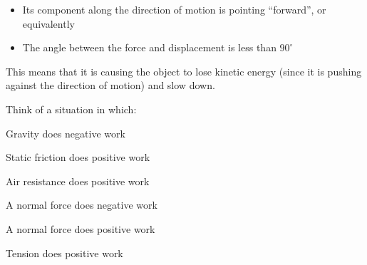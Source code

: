 \documentclass[12pt]{article}
\begin{document}
\begin{itemize}
	\item Its component along the direction of motion is pointing ``forward'', or equivalently
	\item The angle between the force and displacement is less than $90^\circ$
\end{itemize}

This means that it is causing the object to lose kinetic energy (since it is pushing against the direction of motion) and slow down.


\newpage

Think of a situation in which:

\vspace{0.3in}


\begin{minipage}{0.5\textwidth}	
	\begin{center}
		Gravity does negative work
	\end{center}
\end{minipage}
\begin{minipage}{0.5\textwidth}	
		\begin{center}
	Static friction does positive work
		\end{center}
\end{minipage}


\vspace{1.2in}


\begin{minipage}{0.5\textwidth}	
		\begin{center}
	Air resistance does positive work
		\end{center}
\end{minipage}
\begin{minipage}{0.5\textwidth}	
		\begin{center}
	A normal force does negative work
		\end{center}
\end{minipage}


\vspace{1.2in}


\begin{minipage}{0.5\textwidth}	
		\begin{center}
	A normal force does positive work
		\end{center}
\end{minipage}
\begin{minipage}{0.5\textwidth}	
		\begin{center}
	Tension does positive work
		\end{center}
\end{minipage}
\end{document}
